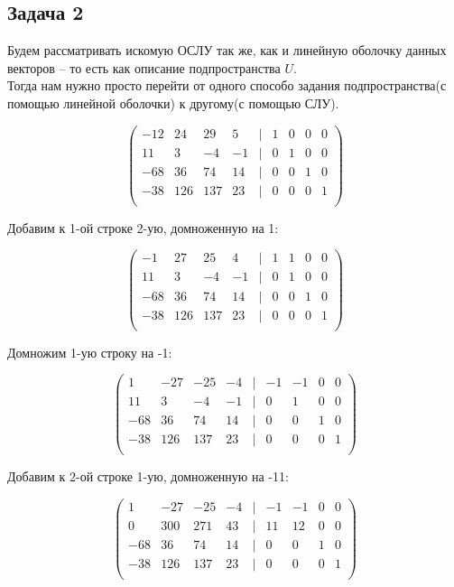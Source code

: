 	
	
	\subsection{Задача 2} 
	
	Будем рассматривать искомую ОСЛУ так же, как и линейную оболочку данных векторов -- то есть как описание подпространства $U$. \\
	Тогда нам нужно просто перейти от одного способо задания подпространства(с помощью линейной оболочки) к другому(с помощью СЛУ).
	
	\[
	\begin{pmatrix}
	-12 & 24 & 29 & 5 & | & 1 & 0 & 0 & 0 \\
	11 & 3 & -4 & -1 & | & 0 & 1 & 0 & 0 \\
	-68 & 36 & 74 & 14 & | & 0 & 0 & 1 & 0 \\
	-38 & 126 & 137 & 23 & | & 0 & 0 & 0 & 1 \\
	\end{pmatrix}
	\]
	
	Добавим к 1-ой строке 2-ую, домноженную на 1:
	
	\[
	\begin{pmatrix}
	-1 & 27 & 25 & 4 & | & 1 & 1 & 0 & 0 \\
	11 & 3 & -4 & -1 & | & 0 & 1 & 0 & 0 \\
	-68 & 36 & 74 & 14 & | & 0 & 0 & 1 & 0 \\
	-38 & 126 & 137 & 23 & | & 0 & 0 & 0 & 1 \\
	\end{pmatrix}
	\]
	
	Домножим 1-ую строку на -1:
	
	\[
	\begin{pmatrix}
	1 & -27 & -25 & -4 & | & -1 & -1 & 0 & 0 \\
	11 & 3 & -4 & -1 & | & 0 & 1 & 0 & 0 \\
	-68 & 36 & 74 & 14 & | & 0 & 0 & 1 & 0 \\
	-38 & 126 & 137 & 23 & | & 0 & 0 & 0 & 1 \\
	\end{pmatrix}
	\]
	
	Добавим к 2-ой строке 1-ую, домноженную на -11:
	
	\[
	\begin{pmatrix}
	1 & -27 & -25 & -4 & | & -1 & -1 & 0 & 0 \\
	0 & 300 & 271 & 43 & | & 11 & 12 & 0 & 0 \\
	-68 & 36 & 74 & 14 & | & 0 & 0 & 1 & 0 \\
	-38 & 126 & 137 & 23 & | & 0 & 0 & 0 & 1 \\
	\end{pmatrix}
	\]
	
